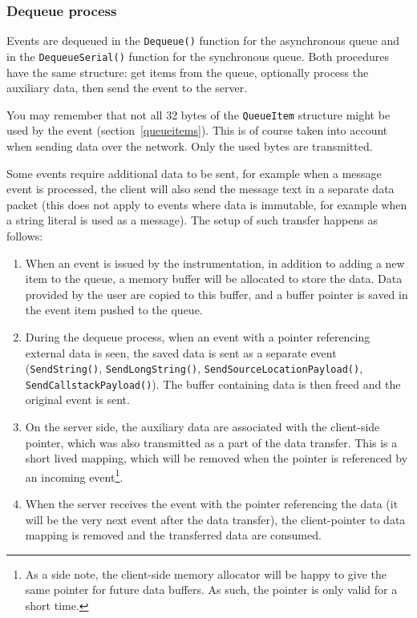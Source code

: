 \documentclass[hidelinks,titlepage,a4paper]{article}
\begin{document}
\subsubsection{Dequeue process}
\label{dequeue}

Events are dequeued in the \texttt{Dequeue()} function for the asynchronous queue and in the \texttt{DequeueSerial()} function for the synchronous queue. Both procedures have the same structure: get items from the queue, optionally process the auxiliary data, then send the event to the server.

You may remember that not all 32 bytes of the \texttt{QueueItem} structure might be used by the event (section~\ref{queueitems}). This is of course taken into account when sending data over the network. Only the used bytes are transmitted.

Some events require additional data to be sent, for example when a message event is processed, the client will also send the message text in a separate data packet (this does not apply to events where data is immutable, for example when a string literal is used as a message). The setup of such transfer happens as follows:

\begin{enumerate}
\item When an event is issued by the instrumentation, in addition to adding a new item to the queue, a memory buffer will be allocated to store the data. Data provided by the user are copied to this buffer, and a buffer pointer is saved in the event item pushed to the queue.
\item During the dequeue process, when an event with a pointer referencing external data is seen, the saved data is sent as a separate event (\texttt{SendString()}, \texttt{SendLongString()}, \texttt{SendSourceLocationPayload()}, \texttt{SendCallstackPayload()}). The buffer containing data is then freed and the original event is sent.
\item On the server side, the auxiliary data are associated with the client-side pointer, which was also transmitted as a part of the data transfer. This is a short lived mapping, which will be removed when the pointer is referenced by an incoming event\footnote{As a side note, the client-side memory allocator will be happy to give the same pointer for future data buffers. As such, the pointer is only valid for a short time.}.
\item When the server receives the event with the pointer referencing the data (it will be the very next event after the data transfer), the client-pointer to data mapping is removed and the transferred data are consumed.
\end{enumerate}
\end{document}
